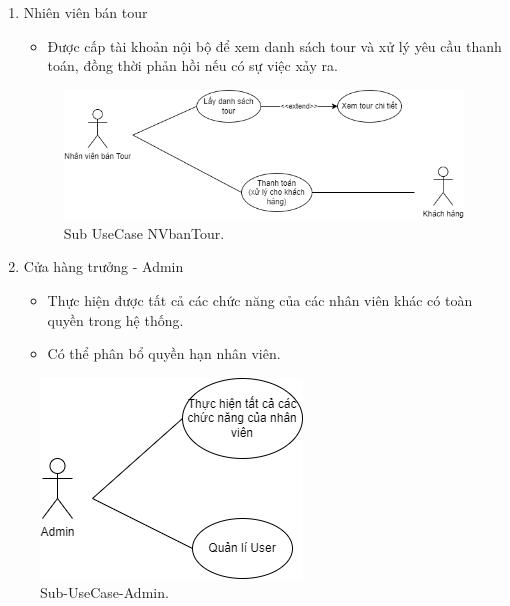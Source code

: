 \begin{enumerate}
\item Nhiên viên bán tour

\begin{itemize}
\item Được cấp tài khoản nội bộ để xem danh sách tour và xử lý yêu cầu thanh toán, đồng thời phản hồi nếu có sự việc xảy ra.
\end{itemize}

\begin{figure}[ht]
    \centering
    \includegraphics[width = 0.7\linewidth]{figures/Sub-UseCase-NVbanTour.png}
    \caption{Sub UseCase NVbanTour.}
    \label{fig:example_1}
\end{figure}

\vspace{5cm}

\item Cửa hàng trưởng - Admin

\begin{itemize}
\item Thực hiện được tất cả các chức năng của các nhân viên khác có toàn quyền trong hệ thống. 
\item Có thể phân bổ quyền hạn nhân viên.
\end{itemize}

\end{enumerate}

\begin{figure}[ht]
    \centering
    \includegraphics[width = 0.4\linewidth]{figures/Sub-UseCase-Admin.png}
    \caption{Sub-UseCase-Admin.}
    \label{fig:example_1}
\end{figure}

\vspace{10cm}

